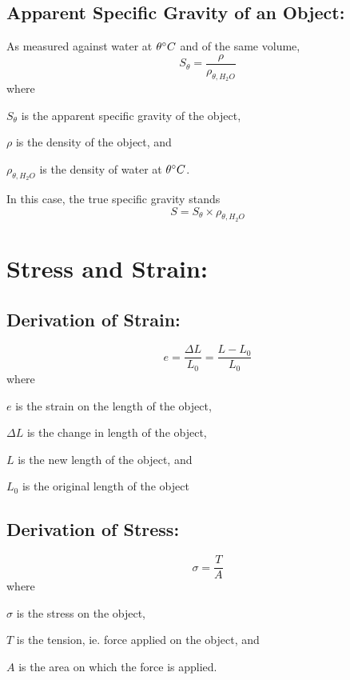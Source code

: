 \documentclass[a4paper]{report}
\begin{document}
        \subsection{Apparent Specific Gravity of an Object: }
            As measured against water at $\theta \degree C$ and of the same volume,
            \begin{equation}
                S_{\theta} = \frac{\rho}{\rho_{\theta, H_2 O}}
            \end{equation}
            where
            \begin{description}
                \item $S_{\theta}$ is the apparent specific gravity of the object,
                \item $\rho$ is the density of the object, and
                \item $\rho_{\theta, H_2 O}$ is the density of water at $\theta \degree C$.
            \end{description}
            In this case, the true specific gravity stands
            \begin{equation}
                S = S_{\theta} \times \rho_{\theta, H_2 O}
            \end{equation}
    \section{Stress and Strain: }
        \subsection{Derivation of Strain: }
            \begin{equation}
                e = \frac{\Delta L}{L_0} = \frac{L-L_0}{L_0}
            \end{equation}
            where
            \begin{description}
                \item $e$ is the strain on the length of the object,
                \item $\Delta L$ is the change in length of the object,
                \item $L$ is the new length of the object, and
                \item $L_0$ is the original length of the object
            \end{description}
        \subsection{Derivation of Stress: }
            \begin{equation}
                \sigma = \frac{T}{A}
            \end{equation}
            where
            \begin{description}
                \item $\sigma$ is the stress on the object,
                \item $T$ is the tension, ie. force applied on the object, and
                \item $A$ is the area on which the force is applied.
            \end{description}
\end{document}
